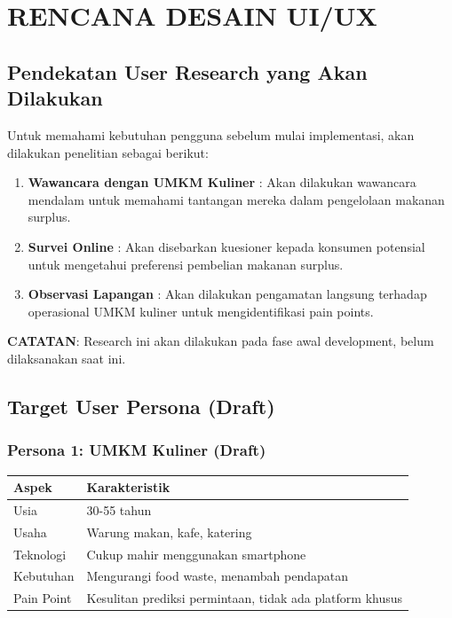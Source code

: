 \section{RENCANA DESAIN UI/UX}

\subsection{Pendekatan User Research yang Akan Dilakukan}

Untuk memahami kebutuhan pengguna sebelum mulai implementasi, akan dilakukan penelitian sebagai berikut:

\begin{enumerate}[leftmargin=*]
    \item \textbf{Wawancara dengan UMKM Kuliner} : Akan dilakukan wawancara mendalam untuk memahami tantangan mereka dalam pengelolaan makanan surplus.
    
    \item \textbf{Survei Online} : Akan disebarkan kuesioner kepada konsumen potensial untuk mengetahui preferensi pembelian makanan surplus.
    
    \item \textbf{Observasi Lapangan} : Akan dilakukan pengamatan langsung terhadap operasional UMKM kuliner untuk mengidentifikasi pain points.
\end{enumerate}

\textbf{CATATAN}: Research ini akan dilakukan pada fase awal development, belum dilaksanakan saat ini.

\subsection{Target User Persona (Draft)}

\subsubsection{Persona 1: UMKM Kuliner (Draft)}
\begin{table}[htbp]
\centering
\begin{tabularx}{0.8\textwidth}{|l|X|}
\hline
\textbf{Aspek} & \textbf{Karakteristik} \\
\hline
Usia & 30-55 tahun \\
\hline
Usaha & Warung makan, kafe, katering \\
\hline
Teknologi & Cukup mahir menggunakan smartphone \\
\hline
Kebutuhan & Mengurangi food waste, menambah pendapatan \\
\hline
Pain Point & Kesulitan prediksi permintaan, tidak ada platform khusus \\
\hline
\end{tabularx}
\end{table}

